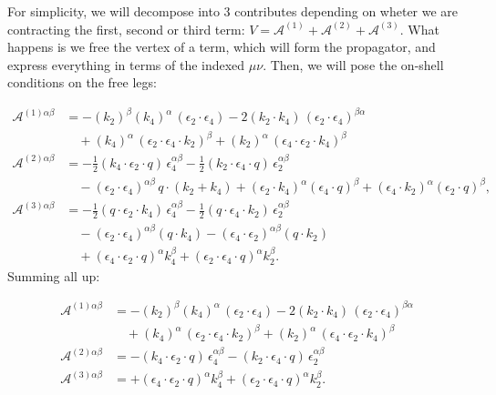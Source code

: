 \documentclass[12pt,a4paper,oneside]{article}
\numberwithin{equation}{section}   %
\begin{document}
For simplicity, we will decompose into 3 contributes depending on wheter we are contracting the first, second or third term:
$V= \mathcal{A}^{(1)}+\mathcal{A}^{(2)}+\mathcal{A}^{(3)}$. What happens is we free the vertex of a term, which will form the propagator, and express everything in terms of the indexed $\mu\nu$. Then, we will pose the on-shell conditions on the free legs:


\begin{align}
\mathcal{A}^{(1)\alpha\beta}
&=
-(k_2)^\beta (k_4)^\alpha\,(\epsilon_2\!\cdot\!\epsilon_4)
-2(k_2\!\cdot\!k_4)\,(\epsilon_2\!\cdot\!\epsilon_4)^{\beta\alpha}
\nonumber\\
&\quad
+(k_4)^\alpha\,(\epsilon_2\!\cdot\!\epsilon_4\!\cdot\!k_2)^\beta
+(k_2)^\alpha\,(\epsilon_4\!\cdot\!\epsilon_2\!\cdot\!k_4)^\beta
\\[1ex]
\mathcal{A}^{(2)\alpha\beta}
&=
-\frac12
(k_4\!\cdot\!\epsilon_2\!\cdot\!q)\,
\epsilon_4^{\alpha\beta}
-\frac12
(k_2\!\cdot\!\epsilon_4\!\cdot\!q)\,
\epsilon_2^{\alpha\beta}
\nonumber\\
&\quad
-(\epsilon_2\!\cdot\!\epsilon_4)^{\alpha\beta}\,
q\!\cdot\!(k_2+k_4)
+(\epsilon_2\!\cdot\!k_4)^\alpha
(\epsilon_4\!\cdot\!q)^\beta
+(\epsilon_4\!\cdot\!k_2)^\alpha
(\epsilon_2\!\cdot\!q)^\beta ,
\\[1ex]
\mathcal{A}^{(3)\alpha\beta}
&=
-\frac12
(q\!\cdot\!\epsilon_2\!\cdot\!k_4)\,
\epsilon_4^{\alpha\beta}
-\frac12
(q\!\cdot\!\epsilon_4\!\cdot\!k_2)\,
\epsilon_2^{\alpha\beta}
\nonumber\\
&\quad
-(\epsilon_2\!\cdot\!\epsilon_4)^{\alpha\beta}
(q\!\cdot\!k_4)
-(\epsilon_4\!\cdot\!\epsilon_2)^{\alpha\beta}
(q\!\cdot\!k_2)
\nonumber\\
&\quad
+(\epsilon_4\!\cdot\!\epsilon_2\!\cdot\!q)^\alpha
k_4^\beta
+(\epsilon_2\!\cdot\!\epsilon_4\!\cdot\!q)^\alpha
k_2^\beta .
\end{align}
Summing all up:


\begin{align}
\mathcal{A}^{(1)\alpha\beta}
&=
-(k_2)^\beta (k_4)^\alpha\,(\epsilon_2\!\cdot\!\epsilon_4)
-2(k_2\!\cdot\!k_4)\,(\epsilon_2\!\cdot\!\epsilon_4)^{\beta\alpha}
\nonumber\\
&\quad
+(k_4)^\alpha\,(\epsilon_2\!\cdot\!\epsilon_4\!\cdot\!k_2)^\beta
+(k_2)^\alpha\,(\epsilon_4\!\cdot\!\epsilon_2\!\cdot\!k_4)^\beta
\\[1ex]
\mathcal{A}^{(2)\alpha\beta}
&=
-
(k_4\!\cdot\!\epsilon_2\!\cdot\!q)\,
\epsilon_4^{\alpha\beta}
-
(k_2\!\cdot\!\epsilon_4\!\cdot\!q)\,
\epsilon_2^{\alpha\beta}
\\[1ex]
\mathcal{A}^{(3)\alpha\beta}
&=
+(\epsilon_4\!\cdot\!\epsilon_2\!\cdot\!q)^\alpha
k_4^\beta
+(\epsilon_2\!\cdot\!\epsilon_4\!\cdot\!q)^\alpha
k_2^\beta .
\end{align}
\end{document}
